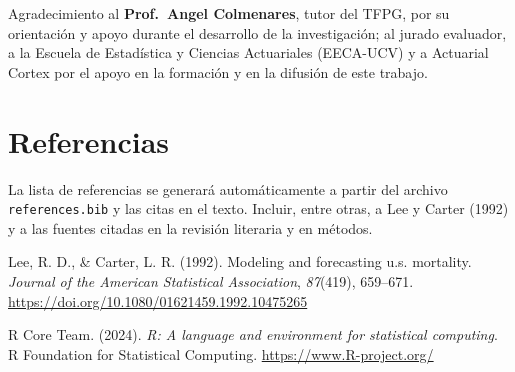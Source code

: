 \documentclass[
  11pt,
  a4paper,
]{article}
\newlength{\cslhangindent}
\newenvironment{CSLReferences}[2] %
 {\begin{list}{}{%
  \setlength{\itemindent}{0pt}
  \setlength{\leftmargin}{0pt}
  \setlength{\parsep}{0pt}
  \ifodd #1
   \setlength{\leftmargin}{\cslhangindent}
   \setlength{\itemindent}{-1\cslhangindent}
  \fi
  \setlength{\itemsep}{#2\baselineskip}}}
 {\end{list}}
\begin{document}
Agradecimiento al \textbf{Prof.~Angel Colmenares}, tutor del TFPG, por
su orientación y apoyo durante el desarrollo de la investigación; al
jurado evaluador, a la Escuela de Estadística y Ciencias Actuariales
(EECA-UCV) y a Actuarial Cortex por el apoyo en la formación y en la
difusión de este trabajo.

\section*{Referencias}\label{referencias}

La lista de referencias se generará automáticamente a partir del archivo
\texttt{references.bib} y las citas en el texto. Incluir, entre otras, a
Lee y Carter (1992) y a las fuentes citadas en la revisión literaria y
en métodos.

\label{refs}
\begin{CSLReferences}{1}{0}
Lee, R. D., \& Carter, L. R. (1992). Modeling and forecasting u.s.
mortality. \emph{Journal of the American Statistical Association},
\emph{87}(419), 659--671.
\url{https://doi.org/10.1080/01621459.1992.10475265}

R Core Team. (2024). \emph{R: A language and environment for statistical
computing}. R Foundation for Statistical Computing.
\url{https://www.R-project.org/}

\end{CSLReferences}
\end{document}
